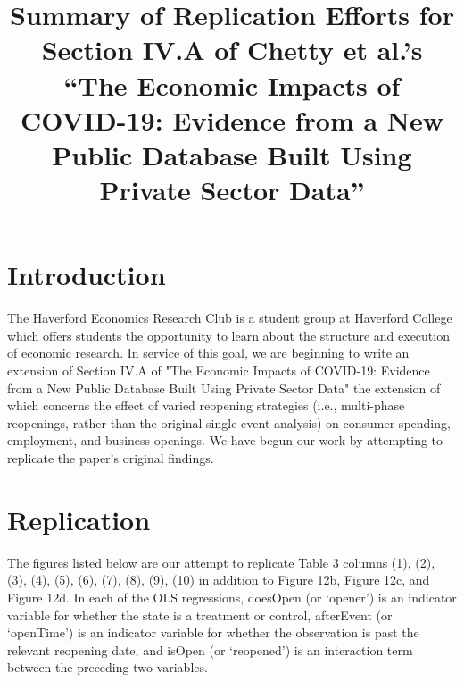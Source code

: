 \documentclass[12pt,letterpaper]{article}
\title{Summary of Replication Efforts for Section IV.A of Chetty et al.’s ``The Economic Impacts of COVID-19: Evidence from a New Public Database Built Using Private Sector Data''}
\begin{document}
  \maketitle
  \section{Introduction}
    The Haverford Economics Research Club is a student group at Haverford College which offers students the opportunity to learn about the structure and execution of economic research. In service of this goal, we are beginning to write an extension of Section IV.A of "The Economic Impacts of COVID-19: Evidence from a New Public Database Built Using Private Sector Data" \parencite{Chetty2020} the extension of which concerns the effect of varied reopening strategies (i.e., multi-phase reopenings, rather than the original single-event analysis) on consumer spending, employment, and business openings.  We have begun our work by attempting to replicate the paper’s original findings.
  \section{Replication}
    The figures listed below are our attempt to replicate Table 3 columns (1), (2), (3), (4), (5), (6), (7), (8), (9), (10) in addition to Figure 12b, Figure 12c, and Figure 12d.  In each of the OLS regressions, doesOpen (or ‘opener’) is an indicator variable for whether the state is a treatment or control, afterEvent (or ‘openTime’) is an indicator variable for whether the observation is past the relevant reopening date, and isOpen (or ‘reopened’) is an interaction term between the preceding two variables. 
      
\end{document}
